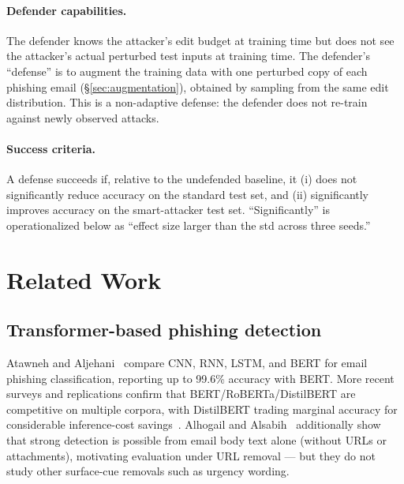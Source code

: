 \documentclass[conference]{IEEEtran}
\begin{document}
\paragraph{Defender capabilities.} The defender knows the attacker's edit
budget at training time but does not see the attacker's actual perturbed
test inputs at training time. The defender's ``defense'' is to augment
the training data with one perturbed copy of each phishing email
(\S\ref{sec:augmentation}), obtained by sampling from the same edit
distribution. This is a non-adaptive defense: the defender does not
re-train against newly observed attacks.

\paragraph{Success criteria.} A defense succeeds if, relative to the
undefended baseline, it (i) does not significantly reduce accuracy on the
standard test set, and (ii) significantly improves accuracy on the
smart-attacker test set. ``Significantly'' is operationalized below as
``effect size larger than the std across three seeds.''

\section{Related Work}
\label{sec:related}

\subsection{Transformer-based phishing detection}
Atawneh and Aljehani~\cite{atawneh2023phishing} compare CNN, RNN, LSTM, and
BERT for email phishing classification, reporting up to 99.6\% accuracy with
BERT. More recent surveys and replications confirm that
BERT/RoBERTa/DistilBERT are competitive on multiple corpora, with DistilBERT
trading marginal accuracy for considerable inference-cost
savings~\cite{phishingbertroberta2026,indepthphishingdl2025,nadeepphishing2025}.
Alhogail and Alsabih~\cite{alhogail2021applying} additionally show that strong
detection is possible from email body text alone (without URLs or
attachments), motivating evaluation under URL removal --- but they do not
study other surface-cue removals such as urgency wording.
\end{document}
